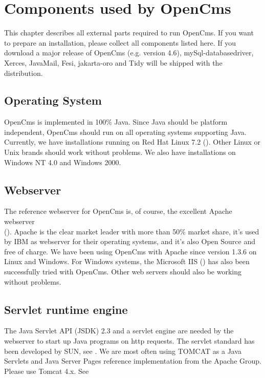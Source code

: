 \chapter{Components used by OpenCms}
\label{components}

This chapter describes all external parts required to run OpenCms.
If you want to prepare an installation, please collect all
components listed here. If you download a major release of OpenCms
(e.g. version 4.6), mySql-databasedriver, Xerces, JavaMail, Fesi, 
jakarta-oro and Tidy will be shipped with the distribution.

\section{Operating System}
OpenCms is implemented in 100\% Java. Since Java should be platform independent, OpenCms should run
on all operating systems supporting Java. Currently, we have installations running on
Red Hat Linux 7.2 (). Other
Linux or Unix brands should work without problems. We also have installations on
Windows NT 4.0 and Windows 2000.

\section{Webserver}
The reference webserver for OpenCms is, of course, the excellent Apache webserver \\
().
Apache is the clear market leader with more than 50\% market share,
it's used by IBM as webserver for their operating systems, and it's also Open Source and
free of charge. We have been using OpenCms with Apache since version 1.3.6 on Linux and Windows.
For Windows systems, the Microsoft IIS ()
has also been successfully tried with OpenCms. Other web servers should also be working without problems.

\section{Servlet runtime engine}
The Java Servlet API (JSDK) 2.3 and a servlet engine are needed by
the webserver to start up Java programs on http requests. The
servlet standard has been developed by SUN, see
.
We are most often using TOMCAT as a Java Servlets and Java Server
Pages reference implementation from the Apache Group. Please use
Tomcat 4.x. See

